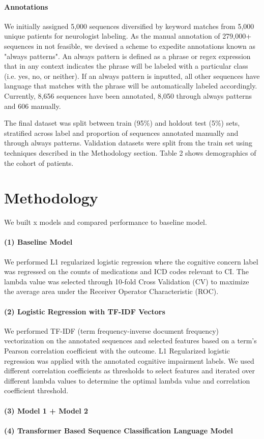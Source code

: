 \documentclass[pmlr,twocolumn,10pt]{jmlr} %
\begin{document}
\paragraph{Annotations}
\label{sec:Annotations} We initially assigned 5,000 sequences diversified by keyword matches from 5,000 unique patients for neurologist labeling. As the manual annotation of 279,000+ sequences in not feasible, we devised a scheme to expedite annotations known as "always patterns". An always pattern is defined as a phrase or regex expression that in any context indicates the phrase will be labeled with a particular class (i.e. yes, no, or neither). If an always pattern is inputted, all other sequences have language that matches with the phrase will be automatically labeled accordingly. %
Currently, 8,656 sequences have been annotated, 8,050 through always patterns and 606 manually. %

The final dataset was split between train (95\%) and holdout test (5\%) sets, stratified across label and proportion of sequences annotated manually and through always patterns. %
Validation datasets were split from the train set using techniques described in the Methodology section. Table 2 shows demographics of the cohort of patients.  

\section{Methodology}
\label{sec:Methodology}  

We built x models and compared performance to baseline model. 

\paragraph{(1) Baseline Model} We performed L1 regularized logistic regression where the cognitive concern label was regressed on the counts of medications and ICD codes relevant to CI. The lambda value was selected through 10-fold Cross Validation (CV) to maximize the average area under the Receiver Operator Characteristic (ROC). %

\paragraph{(2) Logistic Regression with TF-IDF Vectors} We performed TF-IDF (term frequency-inverse document frequency) vectorization on the annotated sequences and selected features based on a term's Pearson correlation coefficient with the outcome. L1 Regularized logistic regression was applied with the annotated cognitive impairment labels. We used different correlation coefficients as thresholds to select features and iterated over different lambda values to determine the optimal lambda value and correlation coefficient threshold. 

\paragraph{(3) Model 1 + Model 2} %

\paragraph{(4) Transformer Based Sequence Classification Language Model} %
\end{document}
